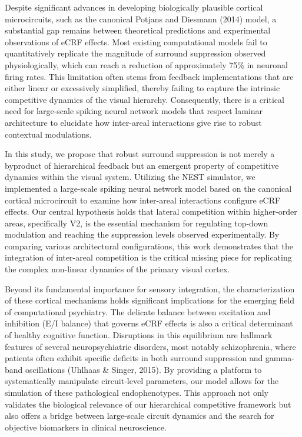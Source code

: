 Despite significant advances in developing biologically plausible cortical microcircuits, such as the canonical Potjans and Diesmann (2014) model, a substantial gap remains between theoretical predictions and experimental observations of eCRF effects. Most existing computational models fail to quantitatively replicate the magnitude of surround suppression observed physiologically, which can reach a reduction of approximately 75\% in neuronal firing rates. This limitation often stems from feedback implementations that are either linear or excessively simplified, thereby failing to capture the intrinsic competitive dynamics of the visual hierarchy. Consequently, there is a critical need for large-scale spiking neural network models that respect laminar architecture to elucidate how inter-areal interactions give rise to robust contextual modulations.

In this study, we propose that robust surround suppression is not merely a byproduct of hierarchical feedback but an emergent property of competitive dynamics within the visual system. Utilizing the NEST simulator, we implemented a large-scale spiking neural network model based on the canonical cortical microcircuit to examine how inter-areal interactions configure eCRF effects. Our central hypothesis holds that lateral competition within higher-order areas, specifically V2, is the essential mechanism for regulating top-down modulation and reaching the suppression levels observed experimentally. By comparing various architectural configurations, this work demonstrates that the integration of inter-areal competition is the critical missing piece for replicating the complex non-linear dynamics of the primary visual cortex.

Beyond its fundamental importance for sensory integration, the characterization of these cortical mechanisms holds significant implications for the emerging field of computational psychiatry. The delicate balance between excitation and inhibition (E/I balance) that governs eCRF effects is also a critical determinant of healthy cognitive function. Disruptions in this equilibrium are hallmark features of several neuropsychiatric disorders, most notably schizophrenia, where patients often exhibit specific deficits in both surround suppression and gamma-band oscillations (Uhlhaas \& Singer, 2015). By providing a platform to systematically manipulate circuit-level parameters, our model allows for the simulation of these pathological endophenotypes. This approach not only validates the biological relevance of our hierarchical competitive framework but also offers a bridge between large-scale circuit dynamics and the search for objective biomarkers in clinical neuroscience.
